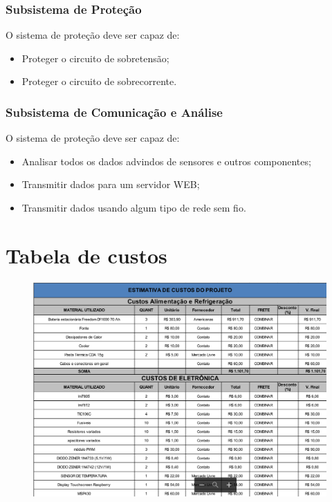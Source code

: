 \subsubsection{Subsistema de Proteção}
O sistema de proteção deve ser capaz de:
\begin{itemize}
	\item Proteger o circuito de sobretensão;
	\item Proteger o circuito de sobrecorrente.
\end{itemize}

\subsubsection{Subsistema de Comunicação e Análise}
O sistema de proteção deve ser capaz de:
\begin{itemize}
	\item Analisar todos os dados advindos de sensores e outros componentes;
	\item Transmitir dados para um servidor WEB;
	\item Transmitir dados usando algum tipo de rede sem fio.	
\end{itemize}


\section{Tabela de custos}

 \begin{figure}[H]
 	\begin{center}
 		\includegraphics[width=15cm]{figuras/custos.png}
 	\end{center}
 \end{figure}
 
